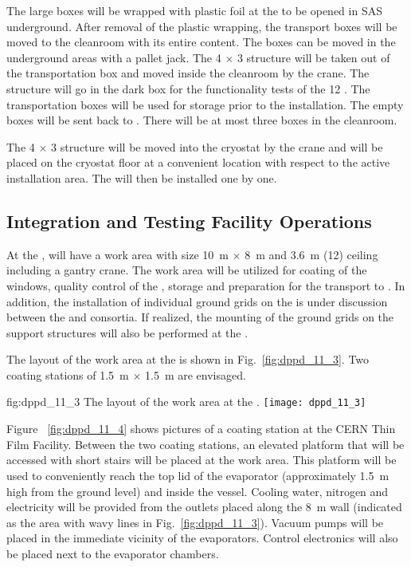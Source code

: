 The large  boxes will be wrapped with plastic foil at the  to be opened in SAS underground. After removal of the plastic wrapping, the transport boxes will be moved to the cleanroom with its entire content. The  boxes can be moved in the underground areas with a pallet jack. The \num{4} $\times$ \num{3} structure will be taken out of the transportation box and moved inside the cleanroom by the crane. The structure will go in the dark box for the functionality tests of the \num{12} . The transportation boxes will be used for storage prior to the installation. The empty boxes will be sent back to . There will be at most three  boxes in the cleanroom.

The \num{4} $\times$ \num{3} structure will be moved into the cryostat by the crane and will be placed on the cryostat floor at a convenient location with respect to the active installation area. The  will then be installed one by one. 

\subsection{Integration and Testing Facility Operations}
\label{subsec:dp-pds-itf}

At the ,  will have a work area with size \SI{10}{\m} $\times$ \SI{8}{\m} and \SI{3.6}{\m} (\SI{12}{\ft}) ceiling including a gantry crane. The work area will be utilized for  coating of the  windows, quality control of the , storage and preparation for the transport to \surf. In addition, the installation of individual ground grids on the  is under discussion between the  and  consortia. If realized, the mounting of the ground grids on the  support structures will also be performed at the .

The layout of the  work area at the  is shown in Fig.~\ref{fig:dppd_11_3}. Two coating stations of \SI{1.5}{\m} $\times$ \SI{1.5}{\m} are envisaged.

\begin{dunefigure}{fig:dppd_11_3}
{The layout of the  work area at the .}
\texttt{[image: dppd\_11\_3]}
\end{dunefigure}

Figure ~\ref{fig:dppd_11_4} shows pictures of a  coating station at the CERN Thin Film Facility. Between the two coating stations, an elevated platform that will be accessed with short stairs will be placed at the   work area. This platform will be used to conveniently reach the top lid of the evaporator (approximately \SI{1.5}{\m} high from the ground level) and inside the vessel. Cooling water, nitrogen and electricity will be provided from the outlets placed along the \SI{8}{\m} wall (indicated as the area with wavy lines in Fig.~\ref{fig:dppd_11_3}). Vacuum pumps will be placed in the immediate vicinity of the evaporators. Control electronics will also be placed next to the evaporator chambers. 

